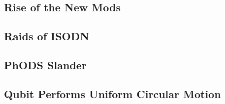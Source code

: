 \subsection{Rise of the New Mods}

\subsection{Raids of ISODN}

\subsection{PhODS Slander}

\subsection{Qubit Performs Uniform Circular Motion}